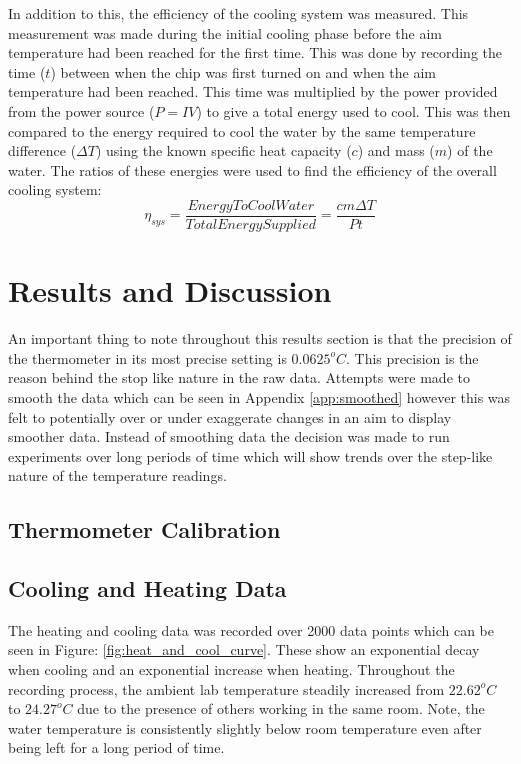 \documentclass[10pt]{article}
\begin{document}
In addition to this, the efficiency of the cooling system was measured. This measurement was made during the initial cooling phase before the aim temperature had been reached for the first time. This was done by recording the time ($t$) between when the chip was first turned on and when the aim temperature had been reached. This time was multiplied by the power provided from the power source ($P=IV$) to give a total energy used to cool. This was then compared to the energy required to cool the water by the same temperature difference ($\Delta T$) using the known specific heat capacity ($c$) and mass ($m$) of the water. The ratios of these energies were used to find the efficiency of the overall cooling system:
\begin{equation}
    \eta_{sys} = \frac{EnergyToCoolWater}{TotalEnergySupplied} = \frac{cm\Delta T}{Pt}
\end{equation}


\section*{Results and Discussion}
An important thing to note throughout this results section is that the precision of the thermometer in its most precise setting is $0.0625^oC$. This precision is the reason behind the stop like nature in the raw data. Attempts were made to smooth the data which can be seen in Appendix \ref{app:smoothed} however this was felt to potentially over or under exaggerate changes in an aim to display smoother data. Instead of smoothing data the decision was made to run experiments over long periods of time which will show trends over the step-like nature of the temperature readings. \\

\subsection*{Thermometer Calibration}
\subsection*{Cooling and Heating Data}
The heating and cooling data was recorded over 2000 data points which can be seen in Figure: \ref{fig:heat_and_cool_curve}. These show an exponential decay when cooling and an exponential increase when heating. Throughout the recording process, the ambient lab temperature steadily increased from $22.62^oC$ to $24.27^oC$ due to the presence of others working in the same room. Note, the water temperature is consistently slightly below room temperature even after being left for a long period of time.\\
\end{document}
